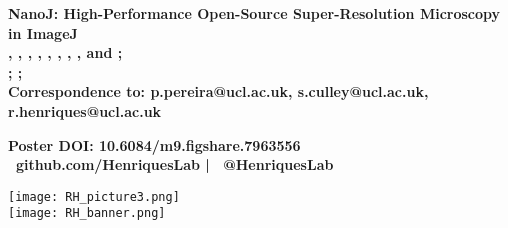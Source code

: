 \documentclass[a0,portrait]{a0poster}
\begin{document}


\begin{minipage}[b]{0.75\linewidth}
\VeryHuge \color{NavyBlue} \textbf{NanoJ: High-Performance Open-Source Super-Resolution Microscopy in ImageJ}
\color{Black}\\[0.4cm] 
\Large \textbf{
, 
, 
, 
, 
, 
, 
, 
, 
 and
; }\\[0.4cm] %
\large \textbf{
; 
; 
}\\[0cm]
\large \textbf{Correspondence to: p.pereira@ucl.ac.uk, s.culley@ucl.ac.uk, r.henriques@ucl.ac.uk}
\begin{center}
    \large \textbf{Poster DOI: 10.6084/m9.figshare.7963556 \\ \faGithub \ github.com/HenriquesLab | \faTwitter \ @HenriquesLab}
\end{center}
\end{minipage}
%
\begin{minipage}[b]{0.25\linewidth}
\begin{center}
\texttt{[image: RH\_picture3.png]}\\ 
\texttt{[image: RH\_banner.png]}\\
\end{center}
\end{minipage}

\end{document}
